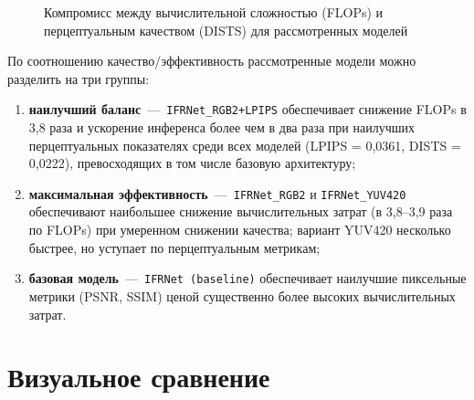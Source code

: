\begin{figure}[H]
	\centering
	\caption{Компромисс между вычислительной сложностью (FLOPs) и перцептуальным качеством (DISTS) для рассмотренных моделей}
	\label{fig:pareto}
\end{figure}

По соотношению качество/эффективность рассмотренные модели можно разделить на три группы:

\begin{enumerate}
	\item \textbf{наилучший баланс}~---~\texttt{IFRNet\_RGB2+LPIPS} обеспечивает снижение FLOPs в 3,8 раза и ускорение инференса более чем в два раза при наилучших перцептуальных показателях среди всех моделей (LPIPS = 0,0361, DISTS = 0,0222), превосходящих в том числе базовую архитектуру;

	\item \textbf{максимальная эффективность}~---~\texttt{IFRNet\_RGB2} и \texttt{IFRNet\_YUV420} обеспечивают наибольшее снижение вычислительных затрат (в 3,8--3,9 раза по FLOPs) при умеренном снижении качества; вариант YUV420 несколько быстрее, но уступает по перцептуальным метрикам;

	\item \textbf{базовая модель}~---~\texttt{IFRNet (baseline)} обеспечивает наилучшие пиксельные метрики (PSNR, SSIM) ценой существенно более высоких вычислительных затрат.
\end{enumerate}

\section{Визуальное сравнение}


